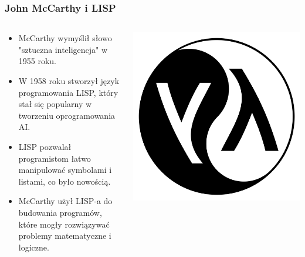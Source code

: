 \documentclass[smaller]{beamer}
\begin{document}

\begin{frame}
\frametitle{John McCarthy i LISP}

\begin{columns}
    \begin{column}{0.6\textwidth}
        \begin{itemize}
            \item McCarthy wymyślił słowo "sztuczna inteligencja" w 1955 roku.
            \item W 1958 roku stworzył język programowania LISP, który stał się popularny w tworzeniu oprogramowania AI.
            \item LISP pozwalał programistom łatwo manipulować symbolami i listami, co było nowością.
            \item McCarthy użył LISP-a do budowania programów, które mogły rozwiązywać problemy matematyczne i logiczne.
        \end{itemize}
    \end{column}

    \begin{column}{0.4\textwidth}
        \includegraphics[width=\textwidth]{../manifest/lisp.png} 
    \end{column}
\end{columns}
\end{frame}
\end{document}
